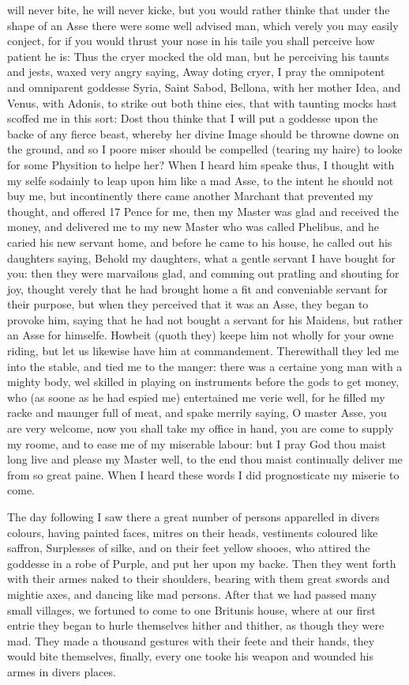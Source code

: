 will never bite, he will never kicke, but you would rather thinke that under
the shape of an Asse there were some well advised man, which verely you may
easily conject, for if you would thrust your nose in his taile you shall
perceive how patient he is: Thus the cryer mocked the old man, but he
perceiving his taunts and jests, waxed very angry saying, Away doting cryer, I
pray the omnipotent and omniparent goddesse Syria, Saint Sabod, Bellona, with
her mother Idea, and Venus, with Adonis, to strike out both thine eies, that
with taunting mocks hast scoffed me in this sort: Dost thou thinke that I will
put a goddesse upon the backe of any fierce beast, whereby her divine Image
should be throwne downe on the ground, and so I poore miser should be compelled
(tearing my haire) to looke for some Physition to helpe her? When I heard him
speake thus, I thought with my selfe sodainly to leap upon him like a mad Asse,
to the intent he should not buy me, but incontinently there came another
Marchant that prevented my thought, and offered 17 Pence for me, then my Master
was glad and received the money, and delivered me to my new Master who was
called Phelibus, and he caried his new servant home, and before he came to his
house, he called out his daughters saying, Behold my daughters, what a gentle
servant I have bought for you: then they were marvailous glad, and comming out
pratling and shouting for joy, thought verely that he had brought home a fit
and conveniable servant for their purpose, but when they perceived that it was
an Asse, they began to provoke him, saying that he had not bought a servant for
his Maidens, but rather an Asse for himselfe. Howbeit (quoth they) keepe him
not wholly for your owne riding, but let us likewise have him at commandement.
Therewithall they led me into the stable, and tied me to the manger: there was
a certaine yong man with a mighty body, wel skilled in playing on instruments
before the gods to get money, who (as soone as he had espied me) entertained me
verie well, for he filled my racke and maunger full of meat, and spake merrily
saying, O master Asse, you are very welcome, now you shall take my office in
hand, you are come to supply my roome, and to ease me of my miserable labour:
but I pray God thou maist long live and please my Master well, to the end thou
maist continually deliver me from so great paine. When I heard these words I
did prognosticate my miserie to come.

The day following I saw there a great number of persons apparelled in divers
colours, having painted faces, mitres on their heads, vestiments coloured like
saffron, Surplesses of silke, and on their feet yellow shooes, who attired the
goddesse in a robe of Purple, and put her upon my backe. Then they went forth
with their armes naked to their shoulders, bearing with them great swords and
mightie axes, and dancing like mad persons. After that we had passed many small
villages, we fortuned to come to one Britunis house, where at our first entrie
they began to hurle themselves hither and thither, as though they were mad.
They made a thousand gestures with their feete and their hands, they would bite
themselves, finally, every one tooke his weapon and wounded his armes in divers
places.

